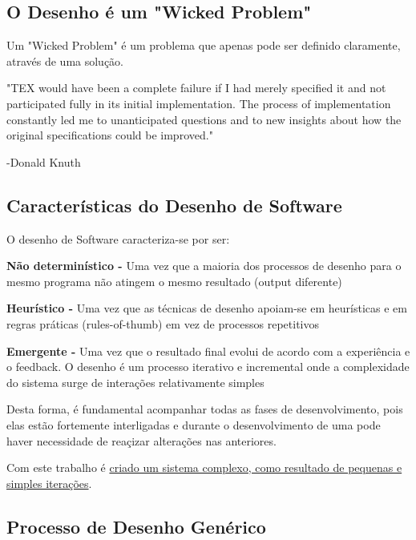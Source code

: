 \documentclass{article}
\begin{document}
\pagebreak

\subsection{O Desenho é um "Wicked Problem"}

Um "Wicked Problem" é um problema que apenas pode ser definido claramente, através de uma solução.

\begin{flushright}
    "TEX would have been a complete failure if I had merely specified it
    and not participated fully in its initial implementation.
    The process of implementation constantly led me to unanticipated questions
    and to new insights about how the original specifications could be improved."

    \vspace{2mm}

    -Donald Knuth
\end{flushright}

\subsection{Características do Desenho de Software}

O desenho de Software caracteriza-se por ser:

\begin{flushleft}
    \textbf{Não determinístico -} Uma vez que a maioria dos processos de desenho
    para o mesmo programa não atingem o mesmo resultado (output diferente)

    \textbf{Heurístico -} Uma vez que as técnicas de desenho apoiam-se em heurísticas e
    em regras práticas (rules-of-thumb) em vez de processos repetitivos

    \textbf{Emergente -} Uma vez que o resultado final evolui de acordo com a
    experiência e o feedback. O desenho é um processo iterativo e incremental onde
    a complexidade do sistema surge de interações relativamente simples
\end{flushleft}

Desta forma, é fundamental acompanhar todas as fases de desenvolvimento, pois elas
estão fortemente interligadas e durante o desenvolvimento de uma pode haver necessidade
de reaçizar alterações nas anteriores.

Com este trabalho é \uline{criado um sistema complexo, como resultado de pequenas e
simples iterações}.

\subsection{Processo de Desenho Genérico}
\end{document}
